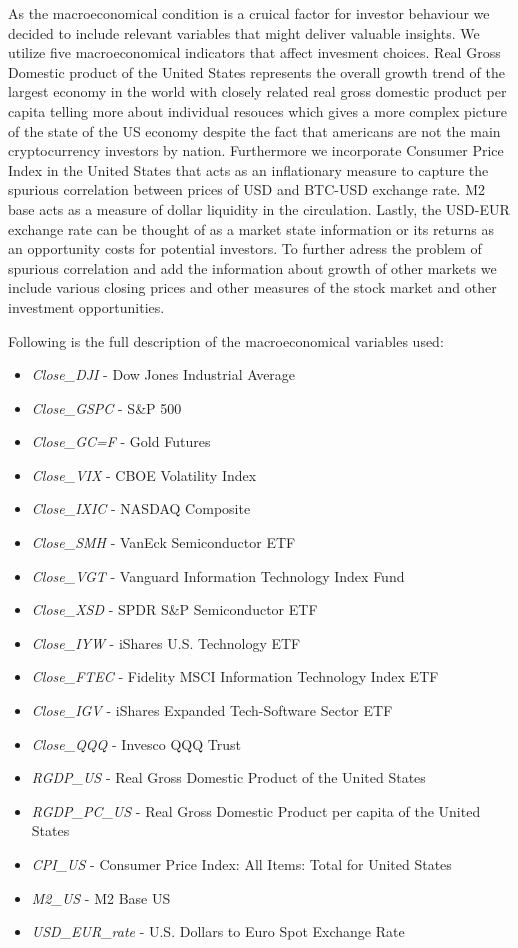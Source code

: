 As the macroeconomical condition is a cruical factor for investor behaviour 
we decided to include relevant variables that might deliver valuable
insights. We utilize five macroeconomical indicators that affect invesment choices.
Real Gross Domestic product of the United States represents the overall
growth trend of the largest economy in the world with closely related real
gross domestic product per capita telling more about individual resouces which
gives a more complex picture of the state of the US economy despite the 
fact that americans are not the main cryptocurrency investors by nation.
Furthermore we incorporate Consumer Price Index in the United States that
acts as an inflationary measure to capture the spurious correlation between 
prices of USD and BTC-USD exchange rate. M2 base acts as a measure
of dollar liquidity in the circulation. Lastly, the USD-EUR exchange rate
can be thought of as a market state information or its returns as an 
opportunity costs for potential investors. To further adress the problem of spurious
correlation and add the information about growth of other markets we include
various closing prices and other measures of the stock market and other 
investment opportunities. 


Following is the full description of the macroeconomical
variables used:

\begin{itemize}
    \item \textit{Close\_DJI} - Dow Jones Industrial Average
    \item \textit{Close\_GSPC} - S\&P 500
    \item \textit{Close\_GC=F} - Gold Futures
    \item \textit{Close\_VIX} - CBOE Volatility Index
    \item \textit{Close\_IXIC} - NASDAQ Composite
    \item \textit{Close\_SMH} - VanEck Semiconductor ETF
    \item \textit{Close\_VGT} - Vanguard Information Technology Index Fund
    \item \textit{Close\_XSD} - SPDR S\&P Semiconductor ETF
    \item \textit{Close\_IYW} - iShares U.S. Technology ETF
    \item \textit{Close\_FTEC} - Fidelity MSCI Information Technology Index ETF
    \item \textit{Close\_IGV} - iShares Expanded Tech-Software Sector ETF
    \item \textit{Close\_QQQ} - Invesco QQQ Trust
    \item \textit{RGDP\_US} - Real Gross Domestic Product of the United States
    \item \textit{RGDP\_PC\_US} - Real Gross Domestic Product per capita 
    of the United States
    \item \textit{CPI\_US} - Consumer Price Index: All Items: Total for United States
    \item \textit{M2\_US} - M2 Base US
    \item \textit{USD\_EUR\_rate} - U.S. Dollars to Euro Spot Exchange Rate
\end{itemize}


